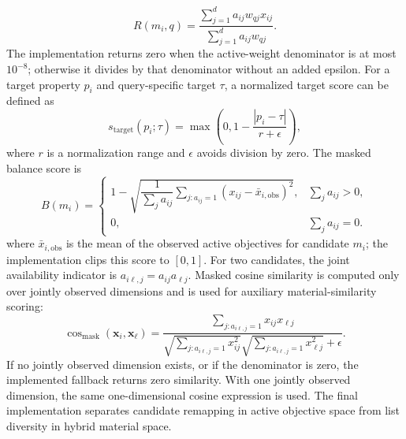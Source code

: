 \documentclass[12pt,a4paper]{article}
\begin{document}
\begin{equation}
  R(m_i, q) =
  \frac{\sum_{j=1}^{d} a_{ij}w_{qj}x_{ij}}
       {\sum_{j=1}^{d} a_{ij}w_{qj}}.
  \label{eq:relevance}
\end{equation}
The implementation returns zero when the active-weight denominator is at most $10^{-8}$; otherwise it divides by that denominator without an added epsilon. For a target property $p_i$ and query-specific target $\tau$, a normalized target score can be defined as
\begin{equation}
  s_{\mathrm{target}}(p_i;\tau) = \max\!\left(0, 1 - \frac{|p_i - \tau|}{r + \epsilon}\right),
\end{equation}
where $r$ is a normalization range and $\epsilon$ avoids division by zero. The masked balance score is
\begin{equation}
  B(m_i) =
  \begin{cases}
  1-\sqrt{\dfrac{1}{\sum_j a_{ij}}\displaystyle\sum_{j:a_{ij}=1}\left(x_{ij}-\bar{x}_{i,\mathrm{obs}}\right)^2}, & \sum_j a_{ij} > 0,\\[8pt]
  0, & \sum_j a_{ij}=0.
  \end{cases}
\end{equation}
where $\bar{x}_{i,\mathrm{obs}}$ is the mean of the observed active objectives for candidate $m_i$; the implementation clips this score to $[0,1]$. For two candidates, the joint availability indicator is $a_{i\ell,j}=a_{ij}a_{\ell j}$. Masked cosine similarity is computed only over jointly observed dimensions and is used for auxiliary material-similarity scoring:
\begin{equation}
  \cos_{\mathrm{mask}}(\mathbf{x}_i,\mathbf{x}_\ell)=
  \frac{\sum_{j:a_{i\ell,j}=1}x_{ij}x_{\ell j}}
       {\sqrt{\sum_{j:a_{i\ell,j}=1}x_{ij}^2}\sqrt{\sum_{j:a_{i\ell,j}=1}x_{\ell j}^2}+\epsilon}.
\end{equation}
If no jointly observed dimension exists, or if the denominator is zero, the implemented fallback returns zero similarity. With one jointly observed dimension, the same one-dimensional cosine expression is used. The final implementation separates candidate remapping in active objective space from list diversity in hybrid material space.
\end{document}
